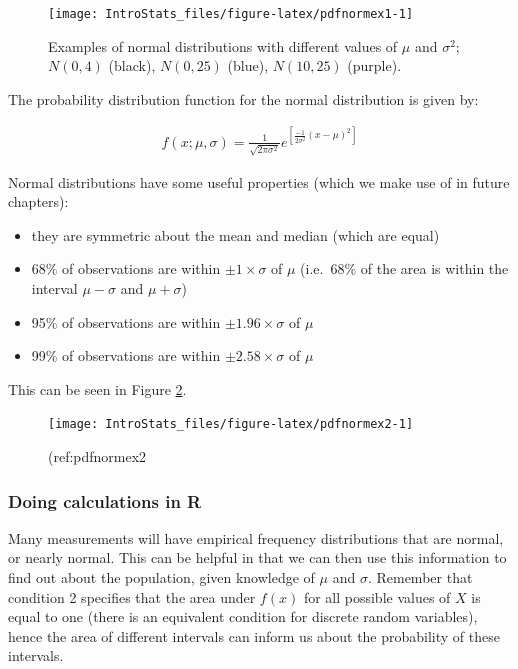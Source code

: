 \documentclass[
  oneside]{krantz}
\begin{document}
\begin{figure}

{\centering \texttt{[image: IntroStats\_files/figure-latex/pdfnormex1-1]} 

}

\caption{Examples of normal distributions with different values of \(\mu\) and \(\sigma^2\); \(N(0,4)\) (black), \(N(0,25)\) (blue), \(N(10, 25)\) (purple).}\label{fig:pdfnormex1}
\end{figure}

The probability distribution function for the normal distribution is given by:

\begin{align}
f(x; \mu, \sigma) = \frac{1}{\sqrt{2\pi\sigma^2}}e^{[\frac{-1}{2\sigma^2}(x-\mu)^2]}
\end{align}

Normal distributions have some useful properties (which we make use of in future chapters):

\begin{itemize}
\item
  they are symmetric about the mean and median (which are equal)
\item
  68\% of observations are within \(\pm 1 \times \sigma\) of \(\mu\) (i.e.~68\% of the area is within the interval \(\mu-\sigma\) and \(\mu + \sigma\))
\item
  95\% of observations are within \(\pm 1.96 \times \sigma\) of \(\mu\)
\item
  99\% of observations are within \(\pm 2.58 \times \sigma\) of \(\mu\)
\end{itemize}

This can be seen in Figure \ref{fig:pdfnormex2}.



\begin{figure}

{\centering \texttt{[image: IntroStats\_files/figure-latex/pdfnormex2-1]} 

}

\caption{(ref:pdfnormex2}\label{fig:pdfnormex2}
\end{figure}

\hypertarget{doing-calculations-in-r}{%
\subsubsection{Doing calculations in R}\label{doing-calculations-in-r}}

Many measurements will have empirical frequency distributions that are normal, or nearly normal. This can be helpful in that we can then use this information to find out about the population, given knowledge of \(\mu\) and \(\sigma\). Remember that condition 2 specifies that the area under \(f(x)\) for all possible values of \(X\) is equal to one (there is an equivalent condition for discrete random variables), hence the area of different intervals can inform us about the probability of these intervals.
\end{document}
